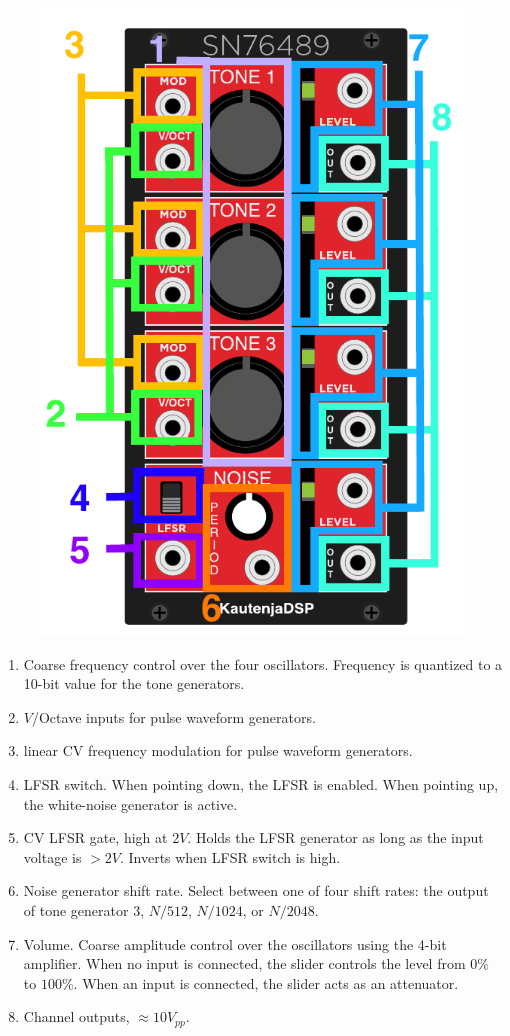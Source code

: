 \documentclass[12pt,letter]{article}
\begin{document}
\begin{figure}[!htp]
\centering
\includegraphics{SN76489-Manual}
\end{figure}

\begin{enumerate}
  \item Coarse frequency control over the four oscillators. Frequency is quantized to a 10-bit value for the tone generators.
  \item $V$/Octave inputs for pulse waveform generators.
  \item linear CV frequency modulation for pulse waveform generators.
  \item LFSR switch. When pointing down, the LFSR is enabled. When pointing up, the white-noise generator is active.
  \item CV LFSR gate, high at $2V$. Holds the LFSR generator as long as the input voltage is $>2V$. Inverts when LFSR switch is high.
  \item Noise generator shift rate. Select between one of four shift rates: the output of tone generator 3, $N / 512$, $N / 1024$, or $N / 2048$.
  \item Volume. Coarse amplitude control over the oscillators using the 4-bit amplifier. When no input is connected, the slider controls the level from $0\%$ to $100\%$. When an input is connected, the slider acts as an attenuator.
  \item Channel outputs, ${\approx}10V_{pp}$.
\end{enumerate}


\clearpage
\renewcommand\refname{References \& Acknowledgments}
\nocite{*}


\end{document}
